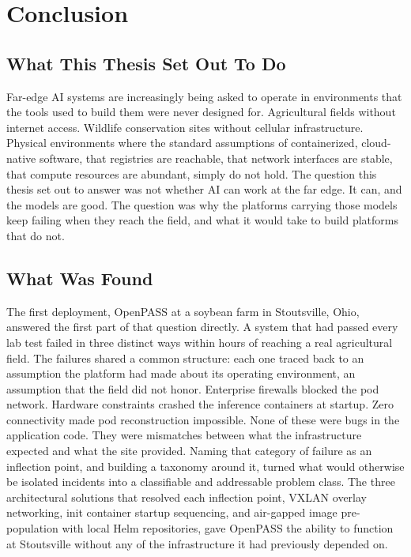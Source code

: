 
\chapter{Conclusion}
\label{ch:conclusion}

\section{What This Thesis Set Out To Do}
\label{sec:concl_intro}
Far-edge AI systems are increasingly being asked to operate in environments that the tools used to build them were never designed for. Agricultural fields without internet access. Wildlife conservation sites without cellular infrastructure. Physical environments where the standard assumptions of containerized, cloud-native software, that registries are reachable, that network interfaces are stable, that compute resources are abundant, simply do not hold. The question this thesis set out to answer was not whether AI can work at the far edge. It can, and the models are good. The question was why the platforms carrying those models keep failing when they reach the field, and what it would take to build platforms that do not.

\section{What Was Found}
\label{sec:concl_rq1}
The first deployment, OpenPASS at a soybean farm in Stoutsville, Ohio, answered the first part of that question directly. A system that had passed every lab test failed in three distinct ways within hours of reaching a real agricultural field. The failures shared a common structure: each one traced back to an assumption the platform had made about its operating environment, an assumption that the field did not honor. Enterprise firewalls blocked the pod network. Hardware constraints crashed the inference containers at startup. Zero connectivity made pod reconstruction impossible. None of these were bugs in the application code. They were mismatches between what the infrastructure expected and what the site provided. Naming that category of failure as an inflection point, and building a taxonomy around it, turned what would otherwise be isolated incidents into a classifiable and addressable problem class. The three architectural solutions that resolved each inflection point, VXLAN overlay networking, init container startup sequencing, and air-gapped image pre-population with local Helm repositories, gave OpenPASS the ability to function at Stoutsville without any of the infrastructure it had previously depended on.

